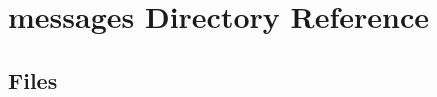 \section{messages Directory Reference}
\label{dir_b8f7637664a38e012eb6b40bd154637c}
\subsection*{Files}
\begin{DoxyCompactItemize}
\end{DoxyCompactItemize}
